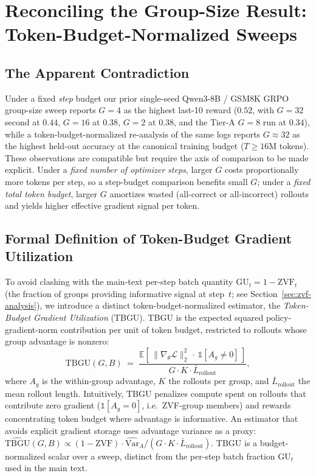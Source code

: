 \section{Reconciling the Group-Size Result: Token-Budget-Normalized Sweeps}
\label{sec:appendix:group-size-reconcile}

\subsection{The Apparent Contradiction}

Under a fixed \emph{step} budget our prior single-seed Qwen3-8B / GSM8K
GRPO group-size sweep reports $G{=}4$ as the highest last-10 reward
($0.52$, with $G{=}32$ second at $0.44$, $G{=}16$ at $0.38$, $G{=}2$ at
$0.38$, and the Tier-A $G{=}8$ run at $0.34$), while a token-budget-normalized
re-analysis of the same logs reports $G{\approx}32$ as the highest held-out
accuracy at the canonical training budget ($T{\ge}16$M tokens). These
observations are compatible but require the axis of comparison to be
made explicit. Under a \emph{fixed number of optimizer steps}, larger
$G$ costs proportionally more tokens per step, so a step-budget
comparison benefits small $G$; under a \emph{fixed total token budget},
larger $G$ amortizes wasted (all-correct or all-incorrect) rollouts
and yields higher effective gradient signal per token.

\subsection{Formal Definition of Token-Budget Gradient Utilization}

To avoid clashing with the main-text per-step batch quantity
$\mathrm{GU}_t = 1 - \mathrm{ZVF}_t$ (the fraction of groups providing
informative signal at step~$t$; see Section~\ref{sec:zvf-analysis}), we
introduce a distinct token-budget-normalized estimator, the
\emph{Token-Budget Gradient Utilization} (TBGU). TBGU is the expected
squared policy-gradient-norm contribution per unit of token budget,
restricted to rollouts whose group advantage is nonzero:
\begin{equation}
\label{eq:gu}
\mathrm{TBGU}(G, B) \;=\;
\frac{\displaystyle\mathbb{E}\!\left[\,\|\nabla_\theta \mathcal{L}\|_2^{2}\,\cdot\,
  \mathbb{1}\!\left[A_g \ne 0\right]\,\right]}
{\displaystyle G \cdot K \cdot \bar{L}_\text{rollout}},
\end{equation}
where $A_g$ is the within-group advantage, $K$ the rollouts per group,
and $\bar{L}_\text{rollout}$ the mean rollout length.
Intuitively, $\mathrm{TBGU}$ penalizes compute spent on rollouts that
contribute zero gradient ($\mathbb{1}[A_g\!=\!0]$, i.e.~ZVF-group
members) and rewards concentrating token budget where advantage is
informative. An estimator that avoids explicit gradient storage uses
advantage variance as a proxy:
$\widehat{\mathrm{TBGU}}(G,B) \!\propto\!
 (1 - \mathrm{ZVF}) \cdot \widehat{\mathrm{Var}}_A / (G\cdot K \cdot \bar{L}_\text{rollout})$.
$\mathrm{TBGU}$ is a budget-normalized scalar over a sweep, distinct from
the per-step batch fraction $\mathrm{GU}_t$ used in the main text.

